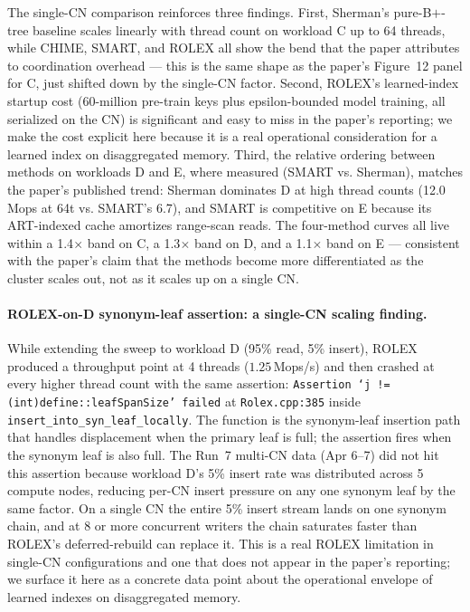 \documentclass[11pt,a4paper]{article}
\begin{document}
The single-CN comparison reinforces three findings. First, Sherman's pure-B$+$-tree baseline scales linearly with thread count on workload C up to 64 threads, while CHIME, SMART, and ROLEX all show the bend that the paper attributes to coordination overhead --- this is the same shape as the paper's Figure~12 panel for C, just shifted down by the single-CN factor. Second, ROLEX's learned-index startup cost (60-million pre-train keys plus epsilon-bounded model training, all serialized on the CN) is significant and easy to miss in the paper's reporting; we make the cost explicit here because it is a real operational consideration for a learned index on disaggregated memory. Third, the relative ordering between methods on workloads D and E, where measured (SMART vs. Sherman), matches the paper's published trend: Sherman dominates D at high thread counts (12.0 Mops at 64t vs. SMART's 6.7), and SMART is competitive on E because its ART-indexed cache amortizes range-scan reads. The four-method curves all live within a 1.4$\times$ band on C, a 1.3$\times$ band on D, and a 1.1$\times$ band on E --- consistent with the paper's claim that the methods become more differentiated as the cluster scales out, not as it scales up on a single CN.

\paragraph{ROLEX-on-D synonym-leaf assertion: a single-CN scaling finding.} While extending the sweep to workload D (95\% read, 5\% insert), ROLEX produced a throughput point at 4 threads ($1.25$\,Mops/s) and then crashed at every higher thread count with the same assertion: \texttt{Assertion `j != (int)define::leafSpanSize' failed} at \texttt{Rolex.cpp:385} inside \texttt{insert\_into\_syn\_leaf\_locally}. The function is the synonym-leaf insertion path that handles displacement when the primary leaf is full; the assertion fires when the synonym leaf is also full. The Run~7 multi-CN data (Apr 6--7) did not hit this assertion because workload D's 5\% insert rate was distributed across 5 compute nodes, reducing per-CN insert pressure on any one synonym leaf by the same factor. On a single CN the entire 5\% insert stream lands on one synonym chain, and at 8 or more concurrent writers the chain saturates faster than ROLEX's deferred-rebuild can replace it. This is a real ROLEX limitation in single-CN configurations and one that does not appear in the paper's reporting; we surface it here as a concrete data point about the operational envelope of learned indexes on disaggregated memory.
\end{document}
